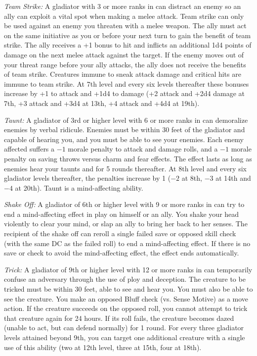 \textit{Team Strike:} A gladiator with 3 or more ranks in  can distract an enemy so an ally can exploit a vital spot when making a melee attack. Team strike can only be used against an enemy you threaten with a melee weapon. The ally must act on the same initiative as you or before your next turn to gain the benefit of team strike. The ally receives a +1 bonus to hit and inflicts an additional 1d4 points of damage on the next melee attack against the target. If the enemy moves out of your threat range before your ally attacks, the ally does not receive the benefits of team strike. Creatures immune to sneak attack damage and critical hits are immune to team strike. At 7th level and every six levels thereafter these bonuses increase by +1 to attack and +1d4 to damage (+2 attack and +2d4 damage at 7th, +3 attack and +3d4 at 13th, +4 attack and +4d4 at 19th).

\textit{Taunt:} A gladiator of 3rd or higher level with 6 or more ranks in  can demoralize enemies by verbal ridicule. Enemies must be within 30 feet of the gladiator and capable of hearing you, and you must be able to see your enemies. Each enemy affected suffers a $-1$ morale penalty to attack and damage rolls, and a $-1$ morale penalty on saving throws versus charm and fear effects. The effect lasts as long as enemies hear your taunts and for 5 rounds thereafter. At 8th level and every six gladiator levels thereafter, the penalties increase by 1 ($-2$ at 8th, $-3$ at 14th and $-4$ at 20th). Taunt is a mind-affecting ability.

\textit{Shake Off:} A gladiator of 6th or higher level with 9 or more ranks in  can try to end a mind-affecting effect in play on himself or an ally. You shake your head violently to clear your mind, or slap an ally to bring her back to her senses. The recipient of the shake off can reroll a single failed save or opposed skill check (with the same DC as the failed roll) to end a mind-affecting effect. If there is no save or check to avoid the mind-affecting effect, the effect ends automatically.

\textit{Trick:} A gladiator of 9th or higher level with 12 or more ranks in  can temporarily confuse an adversary through the use of ploy and deception. The creature to be tricked must be within 30 feet, able to see and hear you. You must also be able to see the creature. You make an opposed Bluff check (vs. Sense Motive) as a move action. If the creature succeeds on the opposed roll, you cannot attempt to trick that creature again for 24 hours. If its roll fails, the creature becomes dazed (unable to act, but can defend normally) for 1 round. For every three gladiator levels attained beyond 9th, you can target one additional creature with a single use of this ability (two at 12th level, three at 15th, four at 18th).

